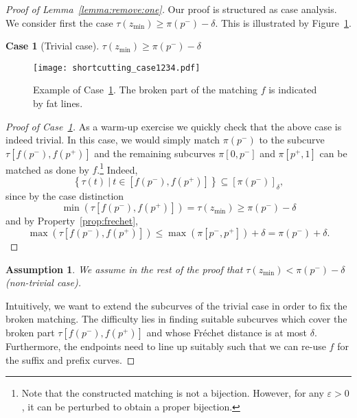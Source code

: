 \documentclass[11pt, letter]{article}
\newtheorem{case}[]{Case}
\newtheorem{assumption}[]{Assumption}
\newcommand{\lemref}[1]{Lemma~\ref{lemma:#1}}
\newcommand{\figlab}[1]{\label{fig:#1}}
\newcommand{\figref}[1]{Figure~\ref{fig:#1}}
\newcommand{\caselab}[1]{\label{case:#1}}
\newcommand{\caseref}[1]{Case~\ref{case:#1}}
\newcommand{\asslab}[1]{\label{ass:#1}}
\newcommand{\propref}[1]{Property~\ref{prop:#1}}
\newcommand{\Frechet}{Fr\'echet\xspace}
\providecommand{\eps}{{\varepsilon}}\newcommand{\Astop}{\overline{a}}
\providecommand{\brc}[1]{\left\{ {#1} \right\}}
\newcommand{\setSubC}[4]{\ensuremath{\brc{ #1(#2) ~|~ #2 \in [#3,#4]} }}
\newcommand{\range}[2]{\ensuremath{[#1]_{#2}}}
\newcommand{\minSubC}[4]{\ensuremath{\min( #1[#3,#4])}}
\newcommand{\maxSubC}[4]{\ensuremath{\max( #1[#3,#4])}}
\begin{document}
\begin{proof}[Proof of \lemref{remove:one}]
Our proof is structured as case analysis. We consider first the case $\tau(z_{\min}) \geq \pi(p^{-}) - \delta$.
This is illustrated by \figref{shortcutting:case1}. 

\begin{case}[Trivial case]
$\tau(z_{\min}) \geq \pi(p^{-}) - \delta$
\caselab{trivial}
\end{case}
\begin{figure}[h]\centering
\texttt{[image: shortcutting\_case1234.pdf]}\\
\caption{Example of \caseref{trivial}. The broken part of the matching $f$ is indicated by fat lines.}
\figlab{shortcutting:case1}
\end{figure}
\begin{proof}[Proof of \caseref{trivial}]
As a warm-up exercise we quickly check that the above case is indeed trivial. In
this case, we would simply match $\pi(p^{-})$ to the subcurve
$\tau[f(p^{-}),f(p^{+})]$ and the remaining subcurves $\pi[0,p^{-}]$ and
$\pi[p^{+},1]$ can be matched as done by $f$.\footnote{Note that the constructed
matching is not a bijection. However, for any $\eps>0$, it can be perturbed to obtain a 
proper bijection.} Indeed, 
\begin{equation*}
\setSubC{\tau}{t}{f(p^{-})}{f(p^{+})} \subseteq \range{\pi(p^{-})}{\delta},
\end{equation*}
since by the case distinction 
\begin{equation*}
\minSubC{\tau}{t}{f(p^{-})}{f(p^{+})} = \tau(z_{\min})   \geq \pi(p^{-}) - \delta
\end{equation*}
and by \propref{frechet}, 
\begin{equation*}
\maxSubC{\tau}{t}{f(p^{-})}{f(p^{+})}  \leq  \maxSubC{\pi}{p}{p^{-}}{p^{+}} +\delta = \pi(p^{-}) +\delta.
\end{equation*}
\end{proof}

\begin{assumption}
We assume in the rest of the proof that $\tau(z_{\min}) < \pi(p^{-}) - \delta$ (non-trivial case).
\asslab{nontrivialcase}
\end{assumption}

Intuitively, we want to extend the subcurves of the
trivial case in order to fix the broken matching. The difficulty lies in finding
suitable subcurves which cover the broken part $\tau[f(p^{-}),f(p^{+})]$ and
whose \Frechet distance is at most $\delta$. Furthermore, the endpoints need to
line up suitably such that we can re-use $f$ for the suffix and prefix curves.


\end{proof}
\end{document}

